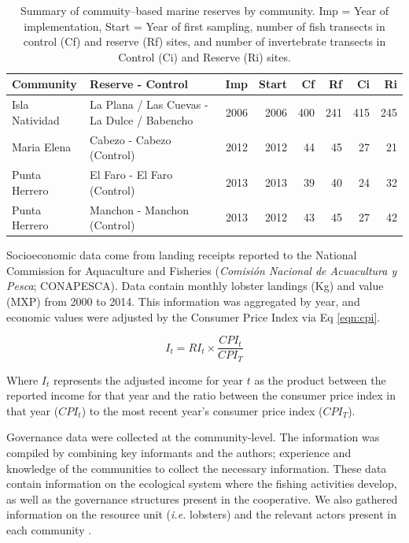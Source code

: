 \documentclass{frontiersSCNS}
\theoremstyle{definition}
\theoremstyle{definition}
\theoremstyle{definition}
\theoremstyle{remark}
\begin{document}
\begin{table}

\caption{\label{tab:unnamed-chunk-2}\label{table:com_sum} Summary of commuity--based marine reserves by community. Imp = Year of implementation, Start = Year of first sampling, number of fish transects in control (Cf) and reserve (Rf) sites, and number of invertebrate transects in Control (Ci) and Reserve (Ri) sites.}
\centering
\begin{tabular}[t]{l|l|r|r|r|r|r|r}
\hline
Community & Reserve - Control & Imp & Start & Cf & Rf & Ci & Ri\\
\hline
Isla Natividad & La Plana / Las Cuevas - La Dulce / Babencho & 2006 & 2006 & 400 & 241 & 415 & 245\\
\hline
Maria Elena & Cabezo - Cabezo (Control) & 2012 & 2012 & 44 & 45 & 27 & 21\\
\hline
Punta Herrero & El Faro - El Faro (Control) & 2013 & 2013 & 39 & 40 & 24 & 32\\
\hline
Punta Herrero & Manchon - Manchon (Control) & 2013 & 2012 & 43 & 45 & 27 & 42\\
\hline
\end{tabular}
\end{table}

Socioeconomic data come from landing receipts reported to the National
Commission for Aquaculture and Fisheries (\emph{Comisión Nacional de
Acuacultura y Pesca}; CONAPESCA). Data contain monthly lobster landings
(Kg) and value (MXP) from 2000 to 2014. This information was aggregated
by year, and economic values were adjusted by the Consumer Price Index
\citep{oecd_2017-VV} via Eq \ref{eqn:cpi}.

\begin{equation}
I_t = RI_t\times\frac{CPI_t}{CPI_T}
\label{eqn:cpi}
\end{equation}

Where \(I_t\) represents the adjusted income for year \(t\) as the
product between the reported income for that year and the ratio between
the consumer price index in that year (\(CPI_t\)) to the most recent
year's consumer price index (\(CPI_T\)).

Governance data were collected at the community-level. The information
was compiled by combining key informants and the authors; experience and
knowledge of the communities to collect the necessary information. These
data contain information on the ecological system where the fishing
activities develop, as well as the governance structures present in the
cooperative. We also gathered information on the resource unit
(\emph{i.e.} lobsters) and the relevant actors present in each community
\citep{leslie_2015-na}.
\end{document}
